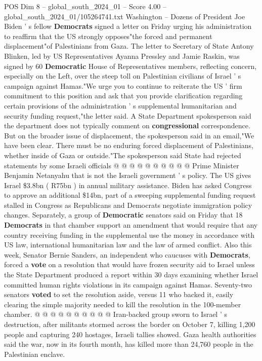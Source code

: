 \begin{textsample}{POS Dim 8 – global\_south\_2024\_01 – Score 4.00 – global\_south\_2024\_01/105264741.txt}  \label{ex:f8_pos_284}
Washington -- Dozens of President Joe Biden ' s fellow \textbf{Democrats} signed a letter on Friday urging his administration to reaffirm that the US strongly opposes"the forced and permanent displacement"of Palestinians from Gaza.
The letter to Secretary of State Antony Blinken, led by US Representatives Ayanna Pressley and Jamie Raskin, was signed by 60 \textbf{Democratic} House of Representatives members, reflecting concern, especially on the Left, over the steep toll on Palestinian civilians of Israel ' s campaign against Hamas."We urge you to continue to reiterate the US ' firm commitment to this position and ask that you provide clarification regarding certain provisions of the administration ' s supplemental humanitarian and security funding request,"the letter said.
A State Department spokesperson said the department does not typically comment on \textbf{congressional} correspondence.
But on the broader issue of displacement, the spokesperson said in an email,"We have been clear.
There must be no enduring forced displacement of Palestinians, whether inside of Gaza or outside."The spokesperson said State had rejected statements by some Israeli officials @ @ @ @ @ @ @ @ @ @ Prime Minister Benjamin Netanyahu that is not the Israeli government ' s policy.
The US gives Israel \$3.8bn ( R75bn ) in annual military assistance.
Biden has asked Congress to approve an additional \$14bn, part of a sweeping supplemental funding request stalled in Congress as Republicans and Democrats negotiate immigration policy changes.
Separately, a group of \textbf{Democratic} senators said on Friday that 18 \textbf{Democrats} in that chamber support an amendment that would require that any country receiving funding in the supplemental use the money in accordance with US law, international humanitarian law and the law of armed conflict.
Also this week, Senator Bernie Sanders, an independent who caucuses with \textbf{Democrats}, forced a \textbf{vote} on a resolution that would have frozen security aid to Israel unless the State Department produced a report within 30 days examining whether Israel committed human rights violations in its campaign against Hamas.
Seventy-two senators \textbf{voted} to set the resolution aside, versus 11 who backed it, easily clearing the simple majority needed to kill the resolution in the 100-member chamber. @ @ @ @ @ @ @ @ @ @ Iran-backed group sworn to Israel ' s destruction, after militants stormed across the border on October 7, killing 1,200 people and capturing 240 hostages, Israeli tallies showed.
Gaza health authorities said the war, now in its fourth month, has killed more than 24,760 people in the Palestinian enclave.

\end{textsample}

